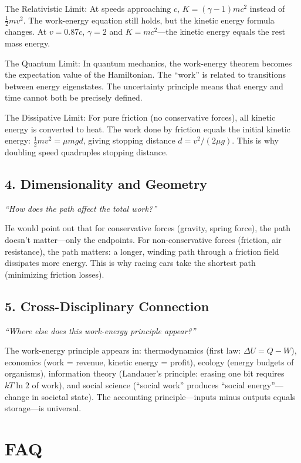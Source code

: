The Relativistic Limit: At speeds approaching $c$, $K = (\gamma - 1)mc^2$ instead of $\frac{1}{2}mv^2$. The work-energy equation still holds, but the kinetic energy formula changes. At $v = 0.87c$, $\gamma = 2$ and $K = mc^2$---the kinetic energy equals the rest mass energy.

The Quantum Limit: In quantum mechanics, the work-energy theorem becomes the expectation value of the Hamiltonian. The ``work'' is related to transitions between energy eigenstates. The uncertainty principle means that energy and time cannot both be precisely defined.

The Dissipative Limit: For pure friction (no conservative forces), all kinetic energy is converted to heat. The work done by friction equals the initial kinetic energy: $\frac{1}{2}mv^2 = \mu mgd$, giving stopping distance $d = v^2/(2\mu g)$. This is why doubling speed quadruples stopping distance.

\subsection*{4. Dimensionality and Geometry}
\textit{``How does the path affect the total work?''}

He would point out that for conservative forces (gravity, spring force), the path doesn't matter---only the endpoints. For non-conservative forces (friction, air resistance), the path matters: a longer, winding path through a friction field dissipates more energy. This is why racing cars take the shortest path (minimizing friction losses).

\subsection*{5. Cross-Disciplinary Connection}
\textit{``Where else does this work-energy principle appear?''}

The work-energy principle appears in: thermodynamics (first law: $\Delta U = Q - W$), economics (work = revenue, kinetic energy = profit), ecology (energy budgets of organisms), information theory (Landauer's principle: erasing one bit requires $kT \ln 2$ of work), and social science (``social work'' produces ``social energy''---change in societal state). The accounting principle---inputs minus outputs equals storage---is universal.
\section*{FAQ}

